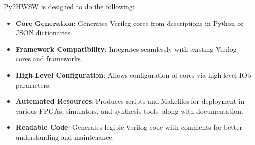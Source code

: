 %

Py2HWSW is designed to do the following:
\begin{itemize}
    \item \textbf{Core Generation}: Generates Verilog cores from descriptions in Python or JSON dictionaries.

    \item \textbf{Framework Compatibility}: Integrates seamlessly with existing Verilog cores and frameworks.

    \item \textbf{High-Level Configuration}: Allows configuration of cores via high-level IOb parameters.

    \item \textbf{Automated Resources}: Produces scripts and Makefiles for deployment in various FPGAs, simulators, and synthesis tools, along with documentation.

    \item \textbf{Readable Code}: Generates legible Verilog code with comments for better understanding and maintenance.

\end{itemize}
